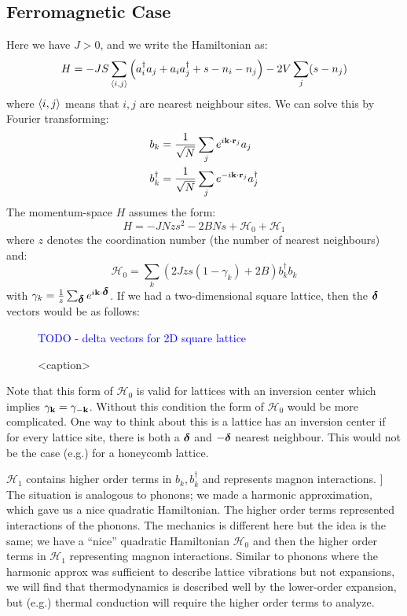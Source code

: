 \subsection{Ferromagnetic Case}
Here we have $J > 0$, and we write the Hamiltonian as:
\begin{equation}
    H = -JS\sum_{\left< i, j \right>}\left(a_i^\dagger a_j + a_i a_j^\dagger + s - n_i - n_j\right) - 2V\sum_j (s - n_j)
\end{equation}
where $\left< i, j \right>$ means that $i, j$ are nearest neighbour sites. We can solve this by Fourier transforming:
\begin{equation}
    \begin{split}
        b_k &= \frac{1}{\sqrt{N}}\sum_j e^{i\mathbf{k}\cdot \mathbf{r}_j}a_j
        \\ b_k^\dagger &= \frac{1}{\sqrt{N}}\sum_j e^{-i\mathbf{k}\cdot \mathbf{r}_j}a_j^\dagger
    \end{split}
\end{equation}
The momentum-space $H$ assumes the form:
\begin{equation}
    H = -JNzs^2 - 2BNs + \mathcal{H}_0 + \mathcal{H}_1
\end{equation}
where $z$ denotes the coordination number (the number of nearest neighbours) and:
\begin{equation}
    \mathcal{H}_0 = \sum_k \left(2Jzs(1 - \gamma_k) + 2B\right)b_k^\dag b_k
\end{equation}
with $\gamma_k = \frac{1}{z}\sum_{\mbox{\boldmath$ \delta $}}e^{i\mathbf{k}\cdot\mbox{\boldmath$ \delta $}}$. If we had a two-dimensional square lattice, then the $\mbox{\boldmath$ \delta $}$ vectors would be as follows:

\begin{figure}[htbp]
    \centering
    \textcolor{blue}{TODO - delta vectors for 2D square lattice}
    \caption{<caption>}
    \label{<label>}
\end{figure}

Note that this form of $\mathcal{H}_0$ is valid for lattices with an inversion center which implies $\gamma_{\mathbf{k}} = \gamma_{-\mathbf{k}}$. Without this condition the form of $\mathcal{H}_0$ would be more complicated. One way to think about this is a lattice has an inversion center if for every lattice site, there is both a $\mbox{\boldmath$ \delta $}$ and $-\mbox{\boldmath$ \delta $}$ nearest neighbour. This would not be the case (e.g.) for a honeycomb lattice.

$\mathcal{H}_1$ contains higher order terms in $b_k, b_k^\dag$ and represents magnon interactions.
]
The situation is analogous to phonons; we made a harmonic approximation, which gave us a nice quadratic Hamiltonian. The higher order terms represented interactions of the phonons. The mechanics is different here but the idea is the same; we have a ``nice'' quadratic Hamiltonian $\mathcal{H}_0$ and then the higher order terms in $\mathcal{H}_1$ representing magnon interactions. Similar to phonons where the harmonic approx was sufficient to describe lattice vibrations but not expansions, we will find that thermodynamics is described well by the lower-order expansion, but (e.g.) thermal conduction will require the higher order terms to analyze.

